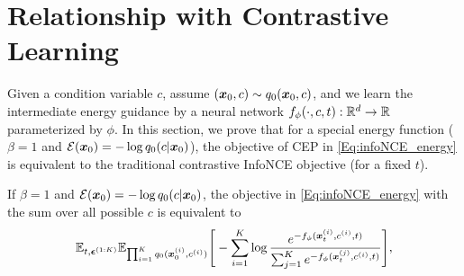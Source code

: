\section{Relationship with Contrastive Learning}
\label{appendix:relationship_infonce}

Given a condition variable $c$, assume $({\bm{x}}_0,c) \sim q_0({\bm{x}}_0,c)$, and we learn the intermediate energy guidance by a neural network $f_\phi(\cdot,c,t):\mathbb{R}^d\rightarrow \mathbb{R}$ parameterized by $\phi$. In this section, we prove that for a special energy function ($\beta=1$ and ${\mathcal{E}}({\bm{x}}_0)=-\log q_0(c|{\bm{x}}_0)$), the objective of CEP in \eqref{Eq:infoNCE_energy} is equivalent to the traditional contrastive InfoNCE objective (for a fixed $t$).


\begin{theorem}
If $\beta=1$ and ${\mathcal{E}}({\bm{x}}_0)=-\log q_0(c|{\bm{x}}_0)$, the objective in \eqref{Eq:infoNCE_energy} with the sum over all possible $c$ is equivalent to
\begin{equation}
    \mathbb{E}_{t,\bm{\epsilon}^{(1:K)}}\mathbb{E}_{\prod_{i=1}^K q_0({\bm{x}}_0^{(i)},c^{(i)})}\Bigg[
    -\sum_{i=1}^K \log \frac{e^{-f_\phi({\bm{x}}_t^{(i)},c^{(i)},t)}}{\sum_{j=1}^K e^{-f_\phi({\bm{x}}_t^{(j)},c^{(i)},t)}}
\Bigg],
\end{equation} 
\end{theorem}

